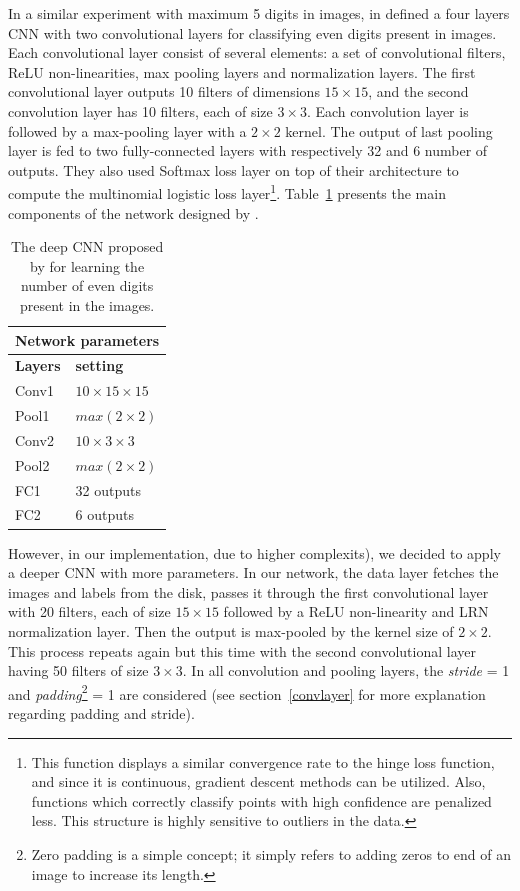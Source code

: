 \noindent In a similar experiment with maximum 5 digits in images, \citeauthor{segui2015learning} in \cite{segui2015learning} defined a four layers CNN with two convolutional layers for classifying even digits present in images. Each convolutional layer consist of several elements: a set of convolutional filters, ReLU non-linearities, max pooling layers and normalization layers. The first convolutional layer outputs 10 filters of dimensions $15\times15$, and the second convolution layer has 10 filters, each of size $3\times3$. Each convolution layer is followed by a max-pooling layer with a $2\times2$ kernel. The output of last pooling layer is fed to two fully-connected layers with respectively 32 and 6 number of outputs. They also used Softmax loss layer on top of their architecture to compute the multinomial logistic loss layer\footnote{This function displays a similar convergence rate to the hinge loss function, and since it is continuous, gradient descent methods can be utilized. Also, functions which correctly classify points with high confidence are penalized less. This structure is highly sensitive to outliers in the data.}. Table~\ref{santil2c} presents the main components of the network designed by \cite{segui2015learning}. 

\begin{table}[H]
	\centering
	\begin{tabular}{ |p{2cm}|p{2cm}| }
	\hline 
	\multicolumn{2}{|c|}{\textbf{Network parameters}} \\
	\hline
	\hline
	\textbf{Layers} & \textbf{setting }\\
	\hline
	Conv1 & $10\times15\times15$\\
	\hline
	Pool1    & $max(2\times2)$ \\
	\hline
	Conv2 & $10\times3\times3$\\
	\hline
	Pool2 &    $max(2\times2)$ \\
	\hline
	FC1 & 32 outputs \\
	\hline
	FC2 & 6 outputs \\
	\hline
	\end{tabular}
		\caption{The deep CNN proposed by \cite{segui2015learning} for learning the number of even digits present in the images.}
		\label{santil2c}
\end{table}
 

\noindent However, in our implementation, due to higher complexits), we decided to apply a deeper CNN with more parameters. 
In our network, the data layer fetches the images and labels from the disk, passes it through the first convolutional layer with 20 filters, each of size $15\times15$ followed by a ReLU non-linearity and LRN normalization layer. Then the output is max-pooled by the  kernel size of $2\times2$. This process repeats again but this time with the second convolutional layer having 50 filters of size $3\times3$. In all convolution and pooling layers, the \textit{stride} = 1 and \textit{padding}\footnote{Zero padding is a simple concept; it simply refers to adding zeros to end of an image to increase its length.} = 1 are considered (see section~\ref{convlayer} for more explanation regarding padding and stride). 

